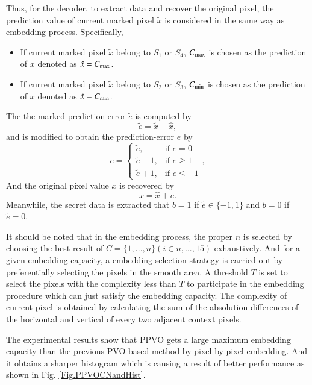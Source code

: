 \documentclass[review,3p,10pt,sort&compress]{elsarticle}
\begin{document}
Thus, for the decoder, to extract data and recover the original pixel, the prediction value of current marked pixel $\tilde{x}$ is considered in the same way as embedding process. Specifically,
\begin{itemize}
  \item If current marked pixel $\tilde{x}$ belong to $S_1$ or $S_4$, $C_{\rm max}$ is chosen as the prediction of $x$ denoted as $\hat{x} = C_{\rm max}$.
  \item If current marked pixel $\tilde{x}$ belong to $S_2$ or $S_3$, $C_{\rm min}$ is chosen as the prediction of $x$ denoted as $\hat{x} = C_{\rm min}$.
\end{itemize}
The the marked prediction-error $\tilde{e}$ is computed by
\begin{equation}\label{eq:dPE}
\tilde{e} = \tilde{x} - \hat{x},
\end{equation}
and is modified to obtain the prediction-error $e$ by
\begin{equation}\label{eq:dPPVOMPE}
e = \left\{\begin{array}{ll}
\tilde{e},      & \text{if } e = 0      \\
\tilde{e} - 1,  & \text{if } e \geq 1   \\
\tilde{e} + 1,  & \text{if } e \leq -1
\end{array}\right.,
\end{equation}
And the original pixel value $x$ is recovered by
\begin{equation}\label{eq:dPPVOX}
x = \hat{x} + e.
\end{equation}
Meanwhile, the secret data is extracted that $b = 1$ if $\tilde{e} \in \{-1, 1\}$ and $b = 0$ if $\tilde{e} = 0$.

It should be noted that in the embedding process, the proper $n$ is selected by choosing the best result of $C = \{1,...,n\}(i \in {n,...,15})$ exhaustively. And for a given embedding capacity, a embedding selection strategy is carried out by preferentially selecting the pixels in the smooth area. A threshold $T$ is set to select the pixels with the complexity less than $T$ to participate in the embedding procedure which can just satisfy the embedding capacity. The complexity of current pixel is obtained by calculating the sum of the absolution differences of the horizontal and vertical of every two adjacent context pixels.

The experimental results show that PPVO gets a large maximum embedding capacity than the previous PVO-based method \cite{Li2013PVO,Peng2014IPVO} by pixel-by-pixel embedding. And it obtains a sharper histogram which is causing a result of better performance as shown in Fig. \ref{Fig.PPVOCNandHist}.
\end{document}
